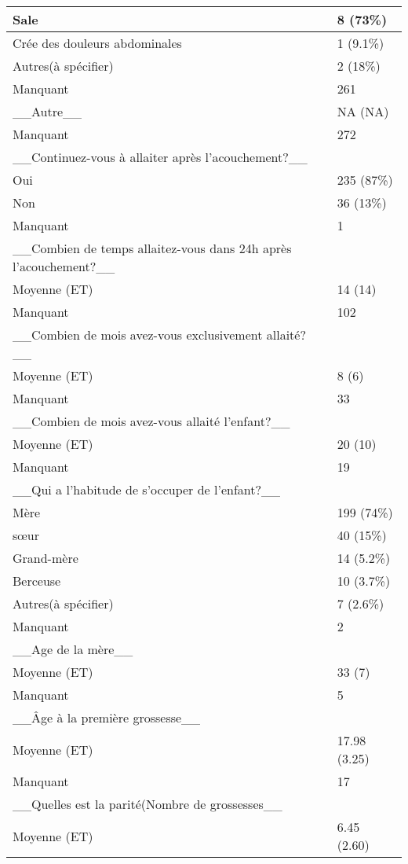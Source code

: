 \documentclass[
]{book}
\begin{document}
\begin{tabular}{l|l}
\hline
Sale & 8 (73\%)\\
\hline
Crée des douleurs abdominales & 1 (9.1\%)\\
\hline
Autres(à spécifier) & 2 (18\%)\\
\hline
Manquant & 261\\
\hline
\_\_Autre\_\_ & NA  (NA)\\
\hline
Manquant & 272\\
\hline
\_\_Continuez-vous à allaiter après l'acouchement?\_\_ & \\
\hline
Oui & 235 (87\%)\\
\hline
Non & 36 (13\%)\\
\hline
Manquant & 1\\
\hline
\_\_Combien de temps allaitez-vous  dans 24h après l'acouchement?\_\_ & \\
\hline
Moyenne  (ET) & 14  (14)\\
\hline
Manquant & 102\\
\hline
\_\_Combien de mois avez-vous exclusivement allaité?\_\_ & \\
\hline
Moyenne  (ET) & 8  (6)\\
\hline
Manquant & 33\\
\hline
\_\_Combien de mois avez-vous  allaité l'enfant?\_\_ & \\
\hline
Moyenne  (ET) & 20  (10)\\
\hline
Manquant & 19\\
\hline
\_\_Qui a l'habitude de s'occuper de l'enfant?\_\_ & \\
\hline
Mère & 199 (74\%)\\
\hline
sœur & 40 (15\%)\\
\hline
Grand-mère & 14 (5.2\%)\\
\hline
Berceuse & 10 (3.7\%)\\
\hline
Autres(à spécifier) & 7 (2.6\%)\\
\hline
Manquant & 2\\
\hline
\_\_Age de la mère\_\_ & \\
\hline
Moyenne  (ET) & 33  (7)\\
\hline
Manquant & 5\\
\hline
\_\_Âge à la première grossesse\_\_ & \\
\hline
Moyenne  (ET) & 17.98  (3.25)\\
\hline
Manquant & 17\\
\hline
\_\_Quelles est la parité(Nombre de grossesses\_\_ & \\
\hline
Moyenne  (ET) & 6.45  (2.60)\\

\end{tabular}
\end{document}
